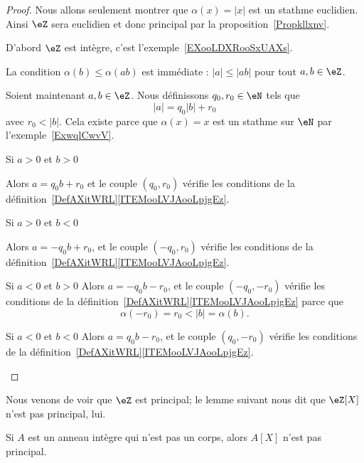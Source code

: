 \begin{proof}
    Nous allons seulement montrer que \( \alpha(x)=| x |\) est un stathme euclidien. Ainsi \( \eZ\) sera euclidien et donc principal par la proposition~\ref{Propkllxnv}.

    D'abord \( \eZ\) est intègre, c'est l'exemple~\ref{EXooLDXRooSxUAXs}.

    La condition \( \alpha(b)\leq \alpha(ab)\) est immédiate : \( | a |\leq | ab |\) pour tout \( a,b\in \eZ\).

    Soient maintenant \( a,b\in \eZ\). Nous définissons \( q_0,r_0\in \eN\) tels que
    \begin{equation}
        | a |=q_0| b |+r_0
    \end{equation}
    avec \( r_0<| b |\). Cela existe parce que \( \alpha(x)=x\) est un stathme sur \( \eN\) par l'exemple~\ref{ExwqlCwvV}.

    \begin{subproof}
        \item[Si \( a>0\) et \( b>0\)]

            Alors \( a=q_0b+r_0\) et le couple \( (q_0,r_0)\) vérifie les conditions de la définition~\ref{DefAXitWRL}\ref{ITEMooLVJAooLpjgEz}.

        \item[Si \( a>0\) et \( b<0\)]

            Alors \( a=-q_0b+r_0\), et le couple \( (-q_0,r_0)\) vérifie les conditions de la définition~\ref{DefAXitWRL}\ref{ITEMooLVJAooLpjgEz}.


        \item[Si \( a<0\) et \( b>0\)]
            Alors \( a=-q_0b-r_0\), et le couple \( (-q_0,-r_0)\) vérifie les conditions de la définition~\ref{DefAXitWRL}\ref{ITEMooLVJAooLpjgEz} parce que
            \begin{equation}
                \alpha(-r_0)=r_0<| b |=\alpha(b).
            \end{equation}
        \item[Si \( a<0\) et \( b<0\)]
            Alors \( a=q_0b-r_0\), et le couple \( (q_0,-r_0)\) vérifie les conditions de la définition~\ref{DefAXitWRL}\ref{ITEMooLVJAooLpjgEz}.

    \end{subproof}
\end{proof}

Nous venons de voir que \( \eZ\) est principal; le lemme suivant nous dit que $\eZ[X]$ n'est pas principal, lui.
\begin{lemma}        \label{LEMooDJSUooJWyxCL}
    Si $A$ est un anneau intègre qui n'est pas un corps, alors \( A[X]\) n'est pas principal.
\end{lemma}

